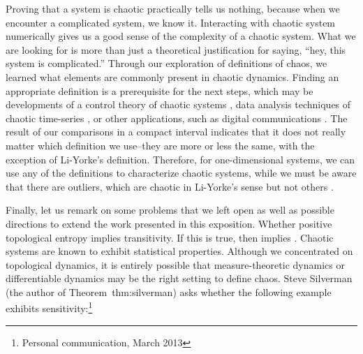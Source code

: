 \documentclass[10pt,twoside,draft]{book}
\begin{document}
Proving that a system is chaotic practically tells us nothing, because when we encounter a complicated system, we know it.
Interacting with chaotic system numerically gives us a good sense of the complexity of a chaotic system.
What we are looking for is more than just a theoretical justification for saying, ``hey, this system is complicated.''
Through our exploration of definitions of chaos, we learned what elements are commonly present in chaotic dynamics.
Finding an appropriate definition is a prerequisite for the next steps, which may be developments of a control theory of chaotic systems \citep{openproblems, chaos-frontiers}, data analysis techniques of chaotic time-series \citep{kantz-schreiber, sprott, abarbanel}, or other applications, such as digital communications \citep{chaos-communication}.
The result of our comparisons in a compact interval indicates that it does not really matter which definition we use--they are more or less the same, with the exception of Li-Yorke's definition.
Therefore, for one-dimensional systems, we can use any of the definitions to characterize chaotic systems, while we must be aware that there are outliers, which are chaotic in Li-Yorke's sense but not others \citep{smital, misiurewicz1}.

Finally, let us remark on some problems that we left open as well as possible directions to extend the work presented in this exposition.
Whether positive topological entropy implies transitivity. 
If this is true, then \akm implies \wig.
Chaotic systems are known to exhibit statistical properties.
Although we concentrated on topological dynamics, it is entirely possible that measure-theoretic dynamics or differentiable dynamics may be the right setting to define chaos.
Steve Silverman (the author of Theorem~{thm:silverman}) asks whether the following example exhibits sensitivity:\footnote{Personal communication, March 2013}
\begin{example}
  
\end{example}



\end{document}

